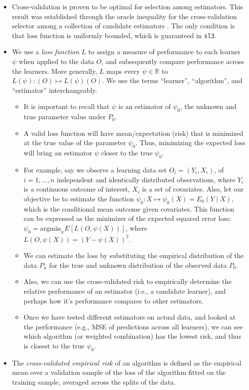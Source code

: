 \documentclass[12pt, krantz2,]{book}
\providecommand{\tightlist}{%
  \setlength{\itemsep}{0pt}\setlength{\parskip}{0pt}}
\theoremstyle{definition}
\theoremstyle{definition}
\theoremstyle{definition}
\newcommand{\1}{\mathbbm{1}}
\begin{document}
\begin{itemize}
\item
  Cross-validation is proven to be optimal for selection among estimators. This
  result was established through the oracle inequality for the cross-validation
  selector among a collection of candidate estimators \citep{vdl2003unified, vaart2006oracle}. The only condition is that loss function is uniformly
  bounded, which is guaranteed in \texttt{sl3}.
\item
  We use a \emph{loss function} \(L\) to assign a measure of performance to each
  learner \(\psi\) when applied to the data \(O\), and subsequently compare
  performance across the learners. More generally, \(L\) maps every
  \(\psi \in \mathbb{R}\) to \(L(\psi) : (O) \mapsto L(\psi)(O)\). We use the terms
  ``learner'', ``algorithm'', and ``estimator'' interchangeably.

  \begin{itemize}
  \tightlist
  \item
    It is important to recall that \(\psi\) is an estimator of \(\psi_0\), the
    unknown and true parameter value under \(P_0\).
  \item
    A valid loss function will have mean/expectation (risk) that is minimized
    at the true value of the parameter \(\psi_0\). Thus, minimizing the expected
    loss will bring an estimator \(\psi\) closer to the true \(\psi_0\).
  \item
    For example, say we observe a learning data set \(O_i=(Y_i,X_i)\), of
    \(i=1, \ldots, n\) independent and identically distributed observations,
    where \(Y_i\) is a continuous outcome of interest, \(X_i\) is a set of
    covariates. Also, let our objective be to estimate the function
    \(\psi_0: X \mapsto \psi_0(X) = E_0(Y \mid X)\), which is the conditional
    mean outcome given covariates. This function can be expressed as the
    minimizer of the expected squared error loss: \(\psi_0 = \text{argmin}_{\psi} E[L(O,\psi(X))]\), where \(L(O,\psi(X)) = (Y − \psi(X))^2\).
  \item
    We can estimate the loss by substituting the empirical distribution of
    the data \(P_n\) for the true and unknown distribution of the observed data
    \(P_0\).
  \item
    Also, we can use the cross-validated risk to empirically determine the
    relative performance of an estimator (i.e., a candidate learner), and
    perhaps how it's performance compares to other estimators.
  \item
    Once we have tested different estimators on actual data, and looked at
    the performance (e.g., MSE of predictions across all learners), we can
    see which algorithm (or weighted combination) has the lowest risk, and
    thus is closest to the true \(\psi_0\).
  \end{itemize}
\item
  The \emph{cross-validated empirical risk} of an algorithm is defined as the
  empirical mean over a validation sample of the loss of the algorithm fitted
  on the training sample, averaged across the splits of the data.


\end{itemize}
\end{document}
